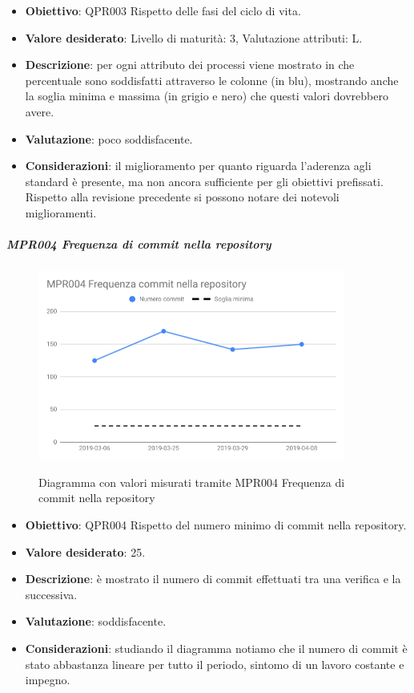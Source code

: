 	\begin{itemize}
		\item \textbf{Obiettivo}: QPR003 Rispetto delle fasi del ciclo di vita.
		\item \textbf{Valore desiderato}: Livello di maturità: 3, Valutazione attributi: L.
		\item \textbf{Descrizione}: per ogni attributo dei processi viene mostrato in che percentuale sono soddisfatti attraverso le colonne (in blu), mostrando anche la soglia minima e massima (in grigio e nero) che questi valori dovrebbero avere.
		\item \textbf{Valutazione}: poco soddisfacente.
		\item \textbf{Considerazioni}: il miglioramento per quanto riguarda l'aderenza agli standard è presente, ma non ancora sufficiente per gli obiettivi prefissati. Rispetto alla revisione precedente
		si possono notare dei notevoli miglioramenti.
	\end{itemize}

	\subparagraph{MPR004 Frequenza di commit nella repository}

	\begin{figure}[H]
		\centering
		\includegraphics[width=0.9\textwidth]{img/cruscotti/RQ/MPR004.png}
		\label{immagineFrequenzaCommitRQ}
		\caption{Diagramma con valori misurati tramite MPR004 Frequenza di commit nella repository}
	\end{figure}

	\begin{itemize}
		\item \textbf{Obiettivo}: QPR004 Rispetto del numero minimo di commit nella repository.
		\item \textbf{Valore desiderato}: 25.
		\item \textbf{Descrizione}: è mostrato il numero di commit effettuati tra una verifica e la successiva.
		\item \textbf{Valutazione}: soddisfacente.
		\item \textbf{Considerazioni}: studiando il diagramma notiamo che il numero di commit è stato
		abbastanza lineare per tutto il periodo, sintomo di un lavoro costante e impegno.
	\end{itemize}

